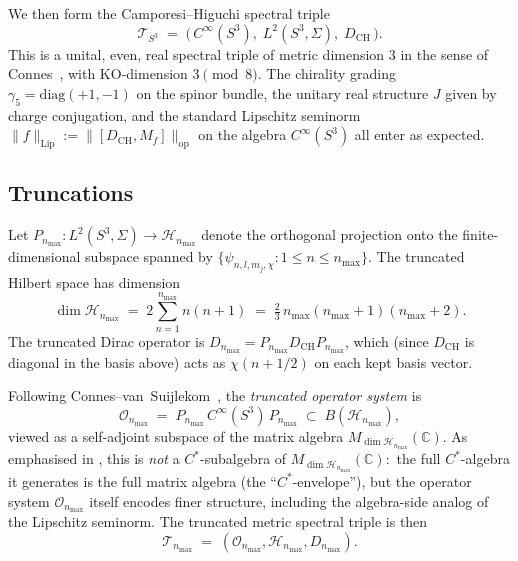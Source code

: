 \documentclass[11pt,a4paper]{article}
\theoremstyle{plain}
\theoremstyle{definition}
\newcommand{\nmax}{n_{\max}}
\newcommand{\sthree}{S^{3}}
\newcommand{\Hilb}{\mathcal{H}}
\newcommand{\Op}{\mathcal{O}}
\newcommand{\Tcal}{\mathcal{T}}
\newcommand{\opnorm}[1]{\lVert #1 \rVert_{\mathrm{op}}}
\newcommand{\Lipnorm}[1]{\lVert #1 \rVert_{\mathrm{Lip}}}
\newcommand{\C}{\mathbb{C}}
\newcommand{\Mat}{M}
\newcommand{\DCH}{D_{\mathrm{CH}}}
\begin{document}
We then form the Camporesi--Higuchi spectral triple
\begin{equation}
\Tcal_{\sthree}
\;=\; \bigl(\, C^\infty(\sthree),\; L^2(\sthree, \Sigma),\; \DCH \,\bigr).
\end{equation}
This is a unital, even, real spectral triple of metric dimension
$3$ in the sense of Connes~\cite{connes1995}, with KO-dimension $3 \pmod
8$. The chirality grading $\gamma_5 = \mathrm{diag}(+1, -1)$ on the
spinor bundle, the unitary real structure $J$ given by charge
conjugation, and the standard Lipschitz seminorm
$\Lipnorm{f} := \opnorm{[\DCH, \Mat_f]}$ on the algebra
$C^\infty(\sthree)$ all enter as expected.

\subsection{Truncations}\label{sec:truncations}

Let $P_{\nmax}: L^2(\sthree, \Sigma) \to \Hilb_{\nmax}$ denote the
orthogonal projection onto the finite-dimensional subspace spanned by
$\{\psi_{n, l, m_j, \chi} : 1 \le n \le \nmax\}$. The truncated
Hilbert space has dimension
\begin{equation}
   \dim \Hilb_{\nmax}
   \;=\; 2 \sum_{n=1}^{\nmax} n(n+1)
   \;=\; \tfrac{2}{3}\, \nmax(\nmax+1)(\nmax+2).
\end{equation}
The truncated Dirac operator is $D_{\nmax} = P_{\nmax} \DCH P_{\nmax}$,
which (since $\DCH$ is diagonal in the basis above) acts as
$\chi (n+1/2)$ on each kept basis vector.

Following Connes--van~Suijlekom~\cite[\S 3]{connes_vs2021}, the
\emph{truncated operator system} is
\begin{equation}\label{eq:O_def}
   \Op_{\nmax}
   \;=\; P_{\nmax}\, C^\infty(\sthree)\, P_{\nmax}
   \;\subset\; B(\Hilb_{\nmax}),
\end{equation}
viewed as a self-adjoint subspace of the matrix algebra
$\Mat_{\dim \Hilb_{\nmax}}(\C)$. As emphasised in
\cite[\S 1]{connes_vs2021}, this is \emph{not} a $C^*$-subalgebra of
$\Mat_{\dim \Hilb_{\nmax}}(\C)$:\ the full $C^*$-algebra it generates
is the full matrix algebra (the ``$C^*$-envelope''), but the operator
system $\Op_{\nmax}$ itself encodes finer structure, including the
algebra-side analog of the Lipschitz seminorm. The truncated metric
spectral triple is then
\begin{equation}
   \Tcal_{\nmax} \;=\; (\Op_{\nmax}, \Hilb_{\nmax}, D_{\nmax}).
\end{equation}
\end{document}
